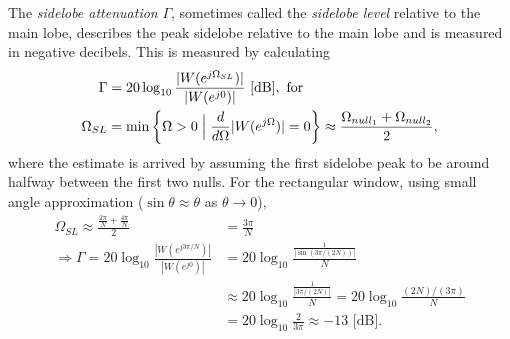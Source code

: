 \documentclass{report}
\begin{document}
\begin{center}
\end{center}
The \emph{sidelobe attenuation} $\Gamma$, sometimes called the \emph{sidelobe level} relative to the main lobe, describes the peak sidelobe relative to the main lobe and is measured in negative decibels. This is measured by calculating
\begin{align}
    \Gamma &= 20 \log_{10}\frac{|W(e^{j\Omega_{SL}})|}{|W(e^{j0})|} \text{ [dB]}, \text{ for} \\
    \Omega_{SL} &= \min\left\{\Omega>0\Bigm| \frac{d}{d\Omega}|W(e^{j\Omega})|=0\right\} \approx \frac{\Omega_{null_1} + \Omega_{null_2}}{2},
\end{align}
where the estimate is arrived by assuming the first sidelobe peak to be around halfway between the first two nulls. 
For the rectangular window, using small angle approximation ($\sin\theta \approx \theta$ as $\theta\to 0$), 
\begin{align*}
    \Omega_{SL} \approx \frac{\frac{2\pi}{N}+\frac{4\pi}{N}}{2} &= \frac{3\pi}{N} \\
    \Longrightarrow\Gamma = 20 \log_{10}\frac{|W(e^{j3\pi/N})|}{|W(e^{j0})|} &= 20\log_{10} \frac{\frac{1}{|\sin(3\pi/(2N))|}}{N} \\
    &\approx 20\log_{10} \frac{\frac{1}{|3\pi/(2N)|}}{N} = 20\log_{10} \frac{(2N)/(3\pi)}{N} \\ 
    &= 20\log_{10} \frac{2}{3\pi} \approx -13 \text{ [dB]}.
\end{align*}
\end{document}
